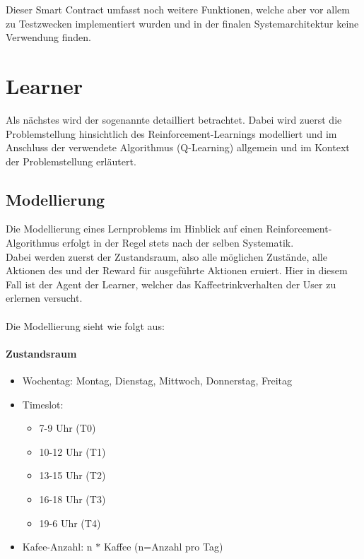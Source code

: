 Dieser Smart Contract umfasst noch weitere Funktionen, welche aber vor allem zu Testzwecken implementiert wurden und in der finalen Systemarchitektur keine Verwendung finden. 


\section{Learner}
\label{sec:ql}
Als nächstes wird der sogenannte  detailliert betrachtet. Dabei wird zuerst die Problemstellung hinsichtlich des Reinforcement-Learnings modelliert und im Anschluss der verwendete Algorithmus (Q-Learning) allgemein und im Kontext der Problemstellung erläutert. \\

\subsection{Modellierung}
\label{subsec:modulation}
Die Modellierung eines Lernproblems im Hinblick auf einen Reinforcement-Algorithmus erfolgt in der Regel stets nach der selben Systematik. \\
Dabei werden zuerst der Zustandsraum, also alle möglichen Zustände, alle Aktionen des  und der Reward für ausgeführte Aktionen eruiert.
Hier in diesem Fall ist der Agent der Learner, welcher das Kaffeetrinkverhalten der User zu erlernen versucht.\\\\
Die Modellierung sieht wie folgt aus: 
\paragraph{Zustandsraum}
\begin{itemize}
	\item Wochentag: Montag, Dienstag, Mittwoch, Donnerstag, Freitag
	\item Timeslot:
	      \begin{itemize}
	      	\item 7-9 Uhr (T0)
	      	\item 10-12 Uhr (T1)
	      	\item 13-15 Uhr (T2)
	      	\item 16-18 Uhr (T3)
	      	\item 19-6 Uhr (T4)
	      \end{itemize} 
	\item Kafee-Anzahl: n $*$ Kaffee (n=Anzahl pro Tag)
\end{itemize}

